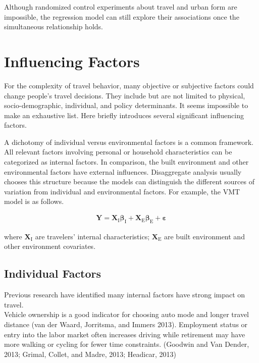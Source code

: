 \documentclass[
  11pt,
  openany]{memoir}
\begin{document}
Although randomized control experiments about travel and urban form are impossible, the regression model can still explore their associations once the simultaneous relationship holds.

\hypertarget{influencing-factors}{%
\section{Influencing Factors}\label{influencing-factors}}

For the complexity of travel behavior, many objective or subjective factors could change people's travel decisions. They include but are not limited to physical, socio-demographic, individual, and policy determinants. It seems impossible to make an exhaustive list. Here briefly introduces several significant influencing factors.

A dichotomy of individual versus environmental factors is a common framework. All relevant factors involving personal or household characteristics can be categorized as internal factors. In comparison, the built environment and other environmental factors have external influences. Disaggregate analysis usually chooses this structure because the models can distinguish the different sources of variation from individual and environmental factors. For example, the VMT model is as follows.

\[\begin{aligned}
\mathbf{Y}=\mathbf{X}_\mathrm{I}\boldsymbol{\beta}_\mathrm{I}+\mathbf{X}_\mathrm{E}\boldsymbol{\beta}_\mathrm{E}+\boldsymbol{\varepsilon}
\end{aligned}\]

where \(\mathbf{X}_\mathrm{I}\) are travelers' internal characteristics; \(\mathbf{X}_\mathrm{E}\) are built environment and other environment covariates.

\hypertarget{individual-factors}{%
\subsection{Individual Factors}\label{individual-factors}}

Previous research have identified many internal factors have strong impact on travel.\\
Vehicle ownership is a good indicator for choosing auto mode and longer travel distance (van der Waard, Jorritsma, and Immers 2013). Employment status or entry into the labor market often increases driving while retirement may have more walking or cycling for fewer time constraints. (Goodwin and Van Dender, 2013; Grimal, Collet, and Madre, 2013; Headicar, 2013)
\end{document}
